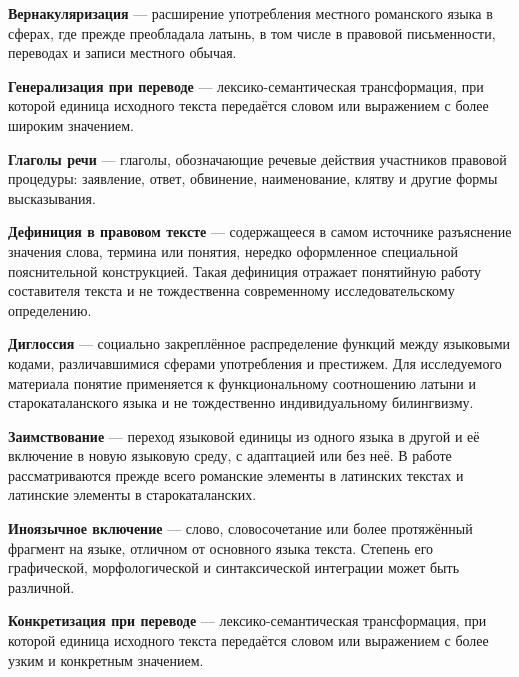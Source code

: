 \noindent\textbf{Вернакуляризация} --- расширение употребления местного романского языка в сферах, где прежде преобладала латынь, в том числе в правовой письменности, переводах и записи местного обычая.
\par\medskip

\noindent\textbf{Генерализация при переводе} --- лексико-семантическая трансформация, при которой единица исходного текста передаётся словом или выражением с более широким значением.
\par\medskip

\noindent\textbf{Глаголы речи} --- глаголы, обозначающие речевые действия участников правовой процедуры: заявление, ответ, обвинение, наименование, клятву и другие формы высказывания.
\par\medskip

\noindent\textbf{Дефиниция в правовом тексте} --- содержащееся в самом источнике разъяснение значения слова, термина или понятия, нередко оформленное специальной пояснительной конструкцией. Такая дефиниция отражает понятийную работу составителя текста и не тождественна современному исследовательскому определению.
\par\medskip

\noindent\textbf{Диглоссия} --- социально закреплённое распределение функций между языковыми кодами, различавшимися сферами употребления и престижем. Для исследуемого материала понятие применяется к функциональному соотношению латыни и старокаталанского языка и не тождественно индивидуальному билингвизму.
\par\medskip

\noindent\textbf{Заимствование} --- переход языковой единицы из одного языка в другой и её включение в новую языковую среду, с адаптацией или без неё. В работе рассматриваются прежде всего романские элементы в латинских текстах и латинские элементы в старокаталанских.
\par\medskip

\noindent\textbf{Иноязычное включение} --- слово, словосочетание или более протяжённый фрагмент на языке, отличном от основного языка текста. Степень его графической, морфологической и синтаксической интеграции может быть различной.
\par\medskip

\noindent\textbf{Конкретизация при переводе} --- лексико-семантическая трансформация, при которой единица исходного текста передаётся словом или выражением с более узким и конкретным значением.
\par\medskip

